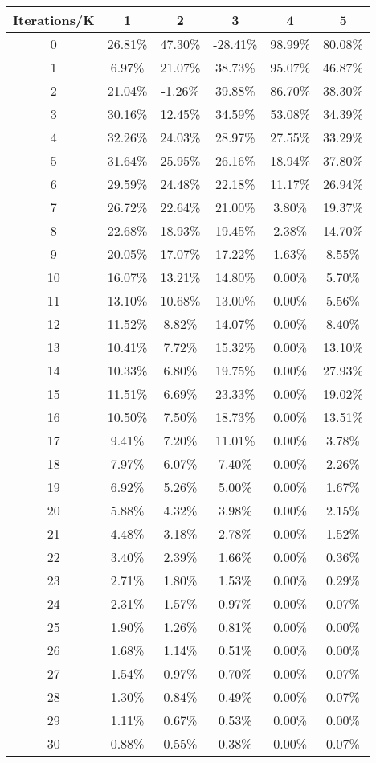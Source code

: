 \documentclass{article}
\begin{document}
\begin{tabular}{|c|c|c|c|c|c|}
\hline
Iterations/K & 1 & 2 & 3 & 4 & 5\\
\hline
\hline
 0 & 26.81\% &	47.30\%	& -28.41\% & 98.99\% & 80.08\% \\
 \hline					
 1 & 6.97\% & 21.07\% & 38.73\% & 95.07\% & 46.87\% \\
 \hline
 2 & 21.04\% & -1.26\% & 39.88\% & 86.70\%	& 38.30\% \\
 \hline
 3 & 30.16\% & 12.45\% & 34.59\% & 53.08\% & 34.39\% \\
 \hline
 4 & 32.26\% & 24.03\% & 28.97\% & 27.55\%	& 33.29\% \\
 \hline
 5	& 31.64\% &	25.95\% & 26.16\% &	18.94\% & 37.80\% \\
 \hline
 6	& 29.59\% & 24.48\% & 22.18\% & 11.17\% & 26.94\% \\
 \hline
 7 & 26.72\% & 22.64\% & 21.00\% & 3.80\% &	19.37\% \\
 \hline
 8	& 22.68\% &	18.93\%	& 19.45\% & 2.38\% & 14.70\% \\
 \hline
 9 & 20.05\% & 17.07\% & 17.22\% & 1.63\% &	8.55\% \\
 \hline
 10 & 16.07\% & 13.21\% & 14.80\% & 0.00\% & 5.70\% \\
 \hline
 11	& 13.10\% &	10.68\% & 13.00\% &	0.00\% & 5.56\% \\
 \hline			
 12	& 11.52\% &	8.82\%	& 14.07\%	& 0.00\% & 8.40\% \\
 \hline
 13	& 10.41\% &	7.72\%	& 15.32\% & 0.00\% & 13.10\% \\
 \hline
 14	& 10.33\% &	6.80\% & 19.75\% & 0.00\% & 27.93\% \\
 \hline			
 15	& 11.51\% & 6.69\% & 23.33\% & 0.00\% & 19.02\% \\
 \hline
 16	& 10.50\% &	7.50\%	& 18.73\% &	0.00\%	& 13.51\% \\
 \hline
 17	& 9.41\% & 7.20\% &	11.01\% & 0.00\% & 3.78\% \\
 \hline
 18 & 7.97\% & 6.07\% & 7.40\% & 0.00\%	& 2.26\% \\
 \hline			
 19	& 6.92\% & 5.26\% &	5.00\% & 0.00\% & 1.67\% \\
 \hline			
 20	& 5.88\% & 4.32\% & 3.98\% & 0.00\%	& 2.15\% \\
 \hline
 21	& 4.48\% & 3.18\% &	2.78\% & 0.00\% & 1.52\% \\
 \hline
 22	& 3.40\% & 2.39\% & 1.66\% & 0.00\%	& 0.36\% \\
 \hline
 23	& 2.71\% & 1.80\% &	1.53\% & 0.00\% & 0.29\% \\
 \hline
 24	& 2.31\% & 1.57\% &	0.97\%	& 0.00\% & 0.07\% \\
 \hline
 25 & 1.90\% & 1.26\% &	0.81\%	& 0.00\% & 0.00\% \\
 \hline
 26	& 1.68\% & 1.14\% &	0.51\%	& 0.00\% & 0.00\% \\
 \hline
 27	& 1.54\% & 0.97\% &	0.70\% & 0.00\% & 0.07\% \\
 \hline
 28	& 1.30\% & 0.84\% &	0.49\% & 0.00\%	& 0.07\% \\
 \hline
 29	& 1.11\% & 0.67\% &	0.53\% & 0.00\%	& 0.00\% \\
 \hline
 30	& 0.88\% & 0.55\% &	0.38\% & 0.00\%	& 0.07\% \\
 \hline 


\end{tabular}
\end{document}
